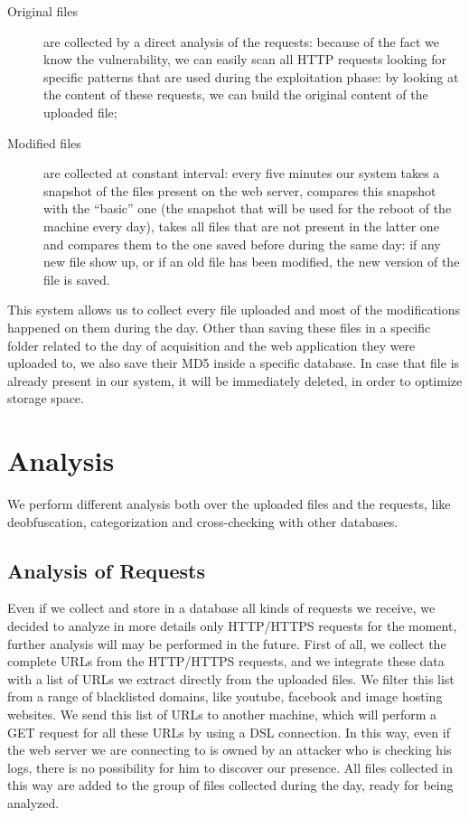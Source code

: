 \begin{description}
\item[Original files] are collected by a direct analysis of the requests: because of the fact we know the vulnerability, we can easily scan all HTTP requests looking for specific patterns that are used during the exploitation phase: by looking at the content of these requests, we can build the original content of the uploaded file;
\item[Modified files] are collected at constant interval: every five minutes our system takes a snapshot of the files present on the web server, compares this snapshot with the ``basic'' one (the snapshot that will be used for the reboot of the machine every day), takes all files that are not present in the latter one and compares them to the one saved before during the same day: if any new file show up, or if an old file has been modified, the new version of the file is saved.
\end{description}

This system allows us to collect every file uploaded and most of the modifications happened on them during the day.
Other than saving these files in a specific folder related to the day of acquisition and the web application they were uploaded to, we also save their MD5 inside a specific database. In case that file is already present in our system, it will be immediately deleted, in order to optimize storage space.

\section{Analysis}

We perform different analysis both over the uploaded files and the requests, like deobfuscation, categorization and cross-checking with other databases.

\subsection{Analysis of Requests}

Even if we collect and store in a database all kinds of requests we receive, we decided to analyze in more details only HTTP/HTTPS requests for the moment, further analysis will may be performed in the future.
First of all, we collect the complete URLs from the HTTP/HTTPS requests, and we integrate these data with a list of URLs we extract directly from the uploaded files. We filter this list from a range of blacklisted domains, like youtube, facebook and image hosting websites. We send this list of URLs to another machine, which will perform a GET request for all these URLs by using a DSL connection. In this way, even if the web server we are connecting to is owned by an attacker who is checking his logs, there is no possibility for him to discover our presence. All files collected in this way are added to the group of files collected during the day, ready for being analyzed.

